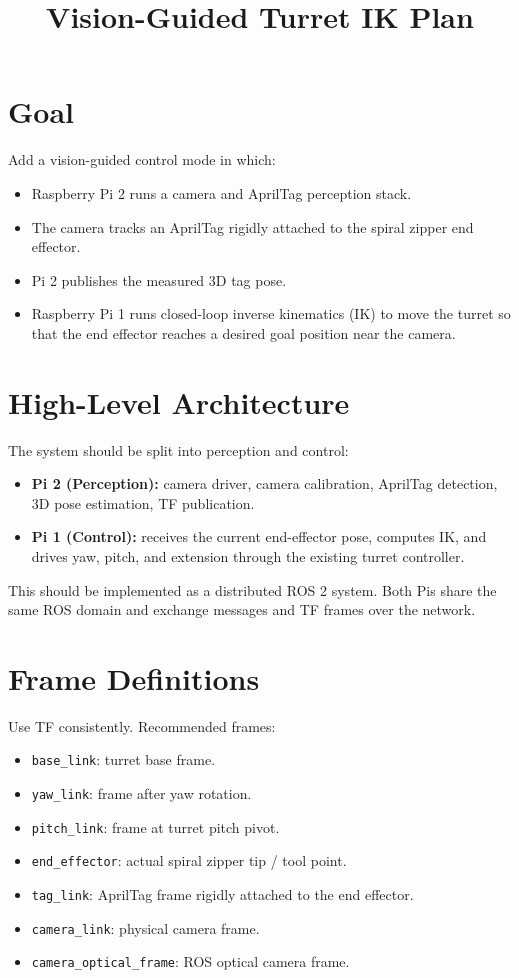 \documentclass[11pt]{article}
\title{Vision-Guided Turret IK Plan}
\author{}
\date{}
\begin{document}
\maketitle

\section*{Goal}
Add a vision-guided control mode in which:
\begin{itemize}[leftmargin=1.5em]
  \item Raspberry Pi 2 runs a camera and AprilTag perception stack.
  \item The camera tracks an AprilTag rigidly attached to the spiral zipper end effector.
  \item Pi 2 publishes the measured 3D tag pose.
  \item Raspberry Pi 1 runs closed-loop inverse kinematics (IK) to move the turret so that the end effector reaches a desired goal position near the camera.
\end{itemize}

\section*{High-Level Architecture}
The system should be split into perception and control:
\begin{itemize}[leftmargin=1.5em]
  \item \textbf{Pi 2 (Perception):} camera driver, camera calibration, AprilTag detection, 3D pose estimation, TF publication.
  \item \textbf{Pi 1 (Control):} receives the current end-effector pose, computes IK, and drives yaw, pitch, and extension through the existing turret controller.
\end{itemize}

This should be implemented as a distributed ROS 2 system. Both Pis share the same ROS domain and exchange messages and TF frames over the network.

\section*{Frame Definitions}
Use TF consistently. Recommended frames:
\begin{itemize}[leftmargin=1.5em]
  \item \texttt{base\_link}: turret base frame.
  \item \texttt{yaw\_link}: frame after yaw rotation.
  \item \texttt{pitch\_link}: frame at turret pitch pivot.
  \item \texttt{end\_effector}: actual spiral zipper tip / tool point.
  \item \texttt{tag\_link}: AprilTag frame rigidly attached to the end effector.
  \item \texttt{camera\_link}: physical camera frame.
  \item \texttt{camera\_optical\_frame}: ROS optical camera frame.
\end{itemize}
\end{document}
